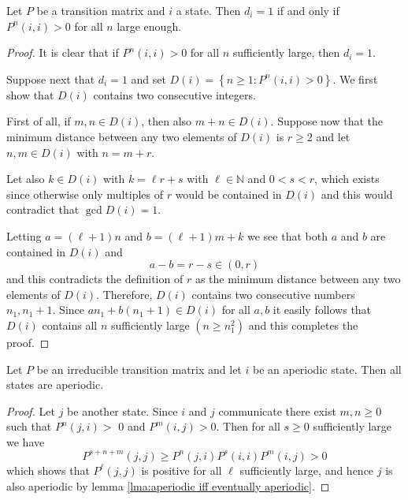 \documentclass[a4paper,11pt]{article}
\begin{document}
\begin{lemma}\label{lma:aperiodic iff eventually aperiodic}
    Let $P$ be a transition matrix and $i$ a state. Then $d_i=1$ if and only if $P^n(i, i)>0$ for all $n$ large enough.
\end{lemma}
\begin{proof}
    It is clear that if $P^n(i, i)>0$ for all $n$ sufficiently large, then $d_i=1$.

    Suppose next that $d_i=1$ and set $D(i)=\left\{n \geq 1: P^n(i, i)>0\right\}$. We first show that $D(i)$ contains two consecutive integers. 
    
    First of all, if $m, n \in D(i)$, then also $m+n \in D(i)$. Suppose now that the minimum distance between any two elements of $D(i)$ is $r \geq 2$ and let $n, m \in D(i)$ with $n=m+r$. 
    
    Let also $k \in D(i)$ with $k=\ell r+s$ with $\ell \in \mathbb{N}$ and $0<s<r$, which exists since otherwise only multiples of $r$ would be contained in $D(i)$ and this would contradict that $ \gcd D(i)=1 $. 
    
    Letting $a=(\ell+1) n$ and $b=(\ell+1) m+k$ we see that both $a$ and $b$ are contained in $D(i)$ and
    \[
    a-b=r-s \in(0, r)
    \]
    and this contradicts the definition of $r$ as the minimum distance between any two elements of $D(i)$. Therefore, $D(i)$ contains two consecutive numbers $n_1, n_1+1$. Since $a n_1+b\left(n_1+1\right) \in D(i)$ for all $a, b$ it easily follows that $D(i)$ contains all $n$ sufficiently large $\left(n \geq n_1^2\right)$ and this completes the proof.
\end{proof}

\begin{lemma}
    Let $P$ be an irreducible transition matrix and let $i$ be an aperiodic state. Then all states are aperiodic.
\end{lemma}
\begin{proof}
    Let $j$ be another state. Since $i$ and $j$ communicate there exist $m, n \geq 0$ such that $P^n(j, i)>$ 0 and $P^m(i, j)>0$. Then for all $s \geq 0$ sufficiently large we have
    \[
    P^{s+n+m}(j, j) \geq P^n(j, i) P^s(i, i) P^m(i, j)>0
    \]
    which shows that $P^{\ell}(j, j)$ is positive for all $\ell$ sufficiently large, and hence $j$ is also aperiodic by lemma \ref{lma:aperiodic iff eventually aperiodic}.
\end{proof}
\end{document}
